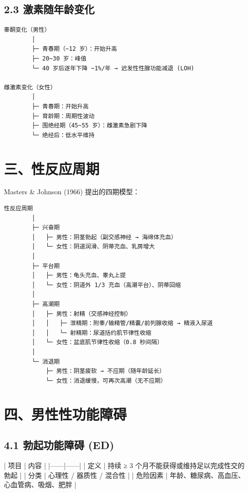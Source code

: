 \documentclass[12pt,UTF8,openany]{ctexbook}
\begin{document}
\subsection{2.3 激素随年龄变化}

\begin{verbatim}
睾酮变化（男性）
        │
        ├─ 青春期（~12 岁）：开始升高
        ├─ 20~30 岁：峰值
        └─ 40 岁后逐年下降 ~1%/年 → 迟发性性腺功能减退 (LOH)

雌激素变化（女性）
        │
        ├─ 青春期：开始升高
        ├─ 育龄期：周期性波动
        ├─ 围绝经期（45~55 岁）：雌激素急剧下降
        └─ 绝经后：低水平维持
\end{verbatim}

\hrulefill

\section{三、性反应周期}

Masters \& Johnson (1966) 提出的四期模型：

\begin{verbatim}
性反应周期
        │
        ├─ 兴奋期
        │   ├─ 男性：阴茎勃起（副交感神经 → 海绵体充血）
        │   └─ 女性：阴道润滑、阴蒂充血、乳房增大
        │
        ├─ 平台期
        │   ├─ 男性：龟头充血、睾丸上提
        │   └─ 女性：阴道外 1/3 充血（高潮平台）、阴蒂回缩
        │
        ├─ 高潮期
        │   ├─ 男性：射精（交感神经控制）
        │   │   ├─ 泄精期：附睾/输精管/精囊/前列腺收缩 → 精液入尿道
        │   │   └─ 射精期：尿道括约肌节律性收缩
        │   └─ 女性：盆底肌节律性收缩（0.8 秒间隔）
        │
        └─ 消退期
            ├─ 男性：阴茎疲软 → 不应期（随年龄延长）
            └─ 女性：消退缓慢，可再次高潮（无不应期）
\end{verbatim}

\hrulefill

\section{四、男性性功能障碍}

\subsection{4.1 勃起功能障碍 (ED)}

| 项目 | 内容 |
|------|------|
| 定义 | 持续 ≥ 3 个月不能获得或维持足以完成性交的勃起 |
| 分类 | 心理性 / 器质性 / 混合性 |
| 危险因素 | 年龄、糖尿病、高血压、心血管病、吸烟、肥胖 |
\end{document}
